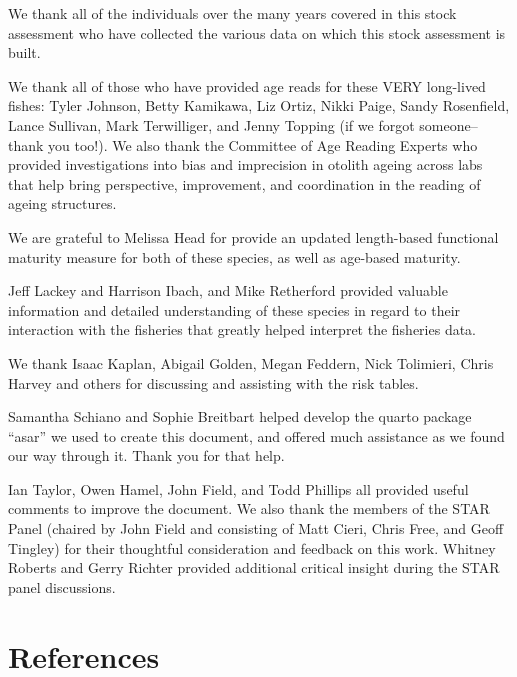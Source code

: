 \documentclass[
]{scrartcl}
\begin{document}
We thank all of the individuals over the many years covered in this
stock assessment who have collected the various data on which this stock
assessment is built.

We thank all of those who have provided age reads for these VERY
long-lived fishes: Tyler Johnson, Betty Kamikawa, Liz Ortiz, Nikki
Paige, Sandy Rosenfield, Lance Sullivan, Mark Terwilliger, and Jenny
Topping (if we forgot someone-- thank you too!). We also thank the
Committee of Age Reading Experts who provided investigations into bias
and imprecision in otolith ageing across labs that help bring
perspective, improvement, and coordination in the reading of ageing
structures.

We are grateful to Melissa Head for provide an updated length-based
functional maturity measure for both of these species, as well as
age-based maturity.

Jeff Lackey and Harrison Ibach, and Mike Retherford provided valuable
information and detailed understanding of these species in regard to
their interaction with the fisheries that greatly helped interpret the
fisheries data.

We thank Isaac Kaplan, Abigail Golden, Megan Feddern, Nick Tolimieri,
Chris Harvey and others for discussing and assisting with the risk
tables.

Samantha Schiano and Sophie Breitbart helped develop the quarto package
``asar'' we used to create this document, and offered much assistance as
we found our way through it. Thank you for that help.

Ian Taylor, Owen Hamel, John Field, and Todd Phillips all provided
useful comments to improve the document. We also thank the members of
the STAR Panel (chaired by John Field and consisting of Matt Cieri,
Chris Free, and Geoff Tingley) for their thoughtful consideration and
feedback on this work. Whitney Roberts and Gerry Richter provided
additional critical insight during the STAR panel discussions.

\newpage{}

\section{References}\label{references}
\end{document}

